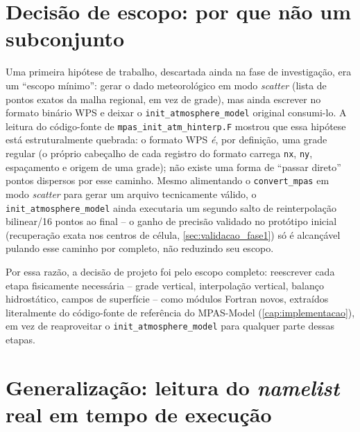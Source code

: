 \section{Decisão de escopo: por que não um subconjunto}
\label{sec:decisao_escopo}

Uma primeira hipótese de trabalho, descartada ainda na fase de
investigação, era um ``escopo mínimo'': gerar o dado meteorológico em
modo \emph{scatter} (lista de pontos exatos da malha regional, em vez de
grade), mas ainda escrever no formato binário WPS e deixar o
\texttt{init\_atmosphere\_model} original consumi-lo. A leitura do
código-fonte de \texttt{mpas\_init\_atm\_hinterp.F} mostrou que essa
hipótese está estruturalmente quebrada: o formato WPS \emph{é}, por
definição, uma grade regular (o próprio cabeçalho de cada registro do
formato carrega \texttt{nx}, \texttt{ny}, espaçamento e origem de uma
grade); não existe uma forma de ``passar direto'' pontos dispersos por
esse caminho. Mesmo alimentando o \texttt{convert\_mpas} em modo
\emph{scatter} para gerar um arquivo tecnicamente válido, o
\texttt{init\_atmosphere\_model} ainda executaria um segundo salto de
reinterpolação bilinear/16 pontos ao final -- o ganho de precisão
validado no protótipo inicial (recuperação exata nos centros de célula,
\cref{sec:validacao_fase1}) só é alcançável pulando esse caminho por
completo, não reduzindo seu escopo.

Por essa razão, a decisão de projeto foi pelo escopo completo: reescrever
cada etapa fisicamente necessária -- grade vertical, interpolação
vertical, balanço hidrostático, campos de superfície -- como módulos
Fortran novos, extraídos literalmente do código-fonte de referência do
MPAS-Model (\cref{cap:implementacao}), em vez de reaproveitar o
\texttt{init\_atmosphere\_model} para qualquer parte dessas etapas.

\section{Generalização: leitura do \textit{namelist} real em tempo de execução}
\label{sec:generalizacao}

